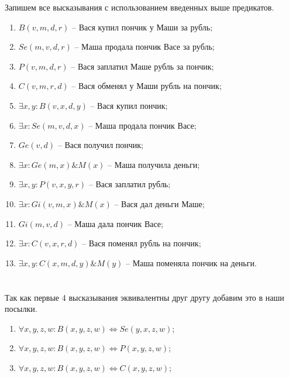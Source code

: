 \documentclass[a4paper,14pt]{article} %
\begin{document}
Запишем все высказывания с использованием введенных выше предикатов.
\begin{enumerate}
    \item \label{1} $B(v, m, d, r)$ -- Вася купил пончик у Маши за рубль;
    \item \label{2} $Se(m, v, d, r)$ -- Маша продала пончик Васе за рубль;
    \item \label{3} $P(v, m, d, r)$ -- Вася заплатил Маше рубль за пончик;
    \item \label{4} $C(v, m, r, d)$ -- Вася обменял у Маши рубль на пончик;
    \item \label{5} $\exists x, y: B(v, x, d, y)$  -- Вася купил пончик;
    \item \label{6} $\exists x: Se(m, v, d, x)$ -- Маша продала пончик Васе;
    \item \label{7} $Ge(v, d)$ -- Вася получил пончик;
    \item \label{8} $\exists x: Ge(m, x) \& M(x)$ -- Маша получила деньги;
    \item \label{9} $\exists x, y: P(v, x, y, r)$ -- Вася заплатил рубль;
    \item \label{10} $\exists x: Gi(v, m, x) \& M(x)$ --  Вася дал деньги Маше;
    \item \label{11} $Gi(m, v, d)$ --  Маша дала пончик Васе;
    \item \label{12} $\exists x: C(v, x, r, d)$ --  Вася поменял рубль на пончик;
    \item \label{13} $\exists x, y: C(x, m, d, y)\&M(y)$ --  Маша поменяла пончик на деньги.
\end{enumerate}


\section{}
Так как первые 4 высказывания эквивалентны друг другу добавим это в наши посылки.
\begin{enumerate}
    \item $\forall x,y,z,w: B(x, y, z, w) \Leftrightarrow Se(y, x, z, w)$;
    \item $\forall x,y,z,w: B(x, y, z,w) \Leftrightarrow P(x, y, z, w)$;
    \item $\forall x,y,z,w: B(x, y, z,w) \Leftrightarrow C(x, y, z, w)$;
\end{enumerate}
\end{document}
